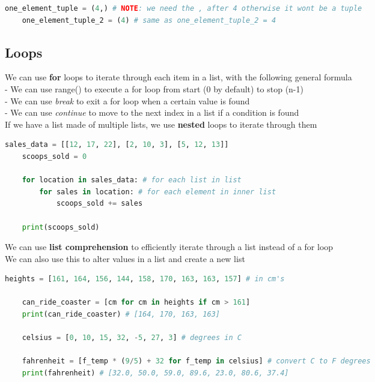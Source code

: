\documentclass[11pt, a4paper]{article}
\begin{document}
\begin{spacing}{1.1}
\begin{lstlisting}[language=Python]
	one_element_tuple = (4,) # NOTE: we need the , after 4 otherwise it wont be a tuple
	one_element_tuple_2 = (4) # same as one_element_tuple_2 = 4	 \end{lstlisting} \newpage
	
	\subsection{Loops}
	We can use \textbf{for} loops to iterate through each item in a list, with the following general formula \\
	\hspace*{3mm} - We can use range() to execute a for loop from start (0 by default) to stop (n-1) \\
	\hspace*{3mm} - We can use \textit{break} to exit a for loop when a certain value is found \\
	\hspace*{3mm} - We can use \textit{continue} to move to the next index in a list if a condition is found \\
	If we have a list made of multiple lists, we use \textbf{nested} loops to iterate through them
	\begin{lstlisting}[language=Python]
	sales_data = [[12, 17, 22], [2, 10, 3], [5, 12, 13]]
	scoops_sold = 0
	
	for location in sales_data: # for each list in list
		for sales in location: # for each element in inner list
			scoops_sold += sales
	
	print(scoops_sold) \end{lstlisting}\vspace*{1mm}
	We can use \textbf{list comprehension} to efficiently iterate through a list instead of a for loop \\
	We can also use this to alter values in a list and create a new list
	\begin{lstlisting}[language=Python]
	heights = [161, 164, 156, 144, 158, 170, 163, 163, 157] # in cm's
	
	can_ride_coaster = [cm for cm in heights if cm > 161]
	print(can_ride_coaster) # [164, 170, 163, 163] 
	
	celsius = [0, 10, 15, 32, -5, 27, 3] # degrees in C
	
	fahrenheit = [f_temp * (9/5) + 32 for f_temp in celsius] # convert C to F degrees
	print(fahrenheit) # [32.0, 50.0, 59.0, 89.6, 23.0, 80.6, 37.4] \end{lstlisting}\vspace*{4mm}
	

\end{spacing}
\end{document}
